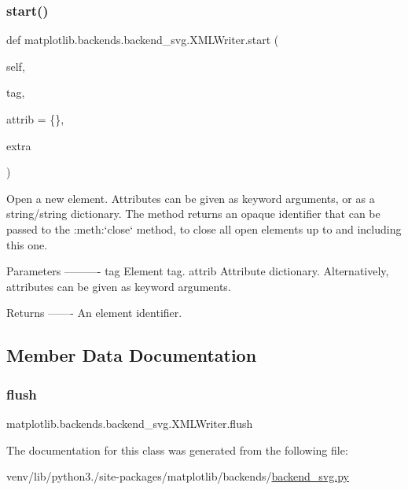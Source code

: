 \subsubsection{\texorpdfstring{start()}{start()}}
{\footnotesize\ttfamily def matplotlib.\+backends.\+backend\+\_\+svg.\+X\+M\+L\+Writer.\+start (\begin{DoxyParamCaption}\item[{}]{self,  }\item[{}]{tag,  }\item[{}]{attrib = {\ttfamily \{\}},  }\item[{}]{extra }\end{DoxyParamCaption})}

\begin{DoxyVerb}Open a new element.  Attributes can be given as keyword
arguments, or as a string/string dictionary. The method returns
an opaque identifier that can be passed to the :meth:`close`
method, to close all open elements up to and including this one.

Parameters
----------
tag
    Element tag.
attrib
    Attribute dictionary.  Alternatively, attributes can be given as
    keyword arguments.

Returns
-------
An element identifier.
\end{DoxyVerb}
 

\subsection{Member Data Documentation}
\mbox{\label{classmatplotlib_1_1backends_1_1backend__svg_1_1XMLWriter_a4e4f558ce8e7474d28f6243cf6d39ef2}} 
\subsubsection{\texorpdfstring{flush}{flush}}
{\footnotesize\ttfamily matplotlib.\+backends.\+backend\+\_\+svg.\+X\+M\+L\+Writer.\+flush}



The documentation for this class was generated from the following file\+:\begin{DoxyCompactItemize}
\item 
venv/lib/python3./site-\/packages/matplotlib/backends/\hyperlink{backend__svg_8py}{backend\+\_\+svg.\+py}\end{DoxyCompactItemize}
